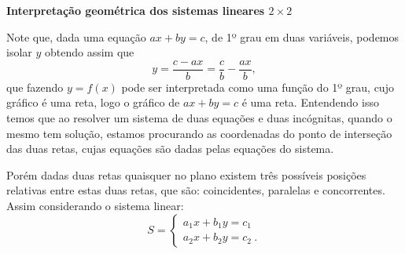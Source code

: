 \textbf{Interpretação geométrica dos sistemas lineares $2 \times 2$}

Note que, dada uma equação $ax + by= c$, de 1º grau em duas variáveis, podemos isolar $y$ obtendo assim que
\[y= \frac{c - ax}{b}= \frac{c}{b} - \frac{ax}{b},\]
que fazendo $y= f(x)$ pode ser interpretada como uma função do 1º grau, cujo gráfico é uma reta, logo o gráfico de $ax + by= c$ é uma reta. Entendendo isso temos que ao resolver um sistema de duas equações e duas incógnitas, quando o mesmo tem solução, estamos procurando as coordenadas do ponto de interseção das duas retas, cujas equações são dadas pelas equações do sistema.

Porém dadas duas retas quaisquer no plano existem três possíveis posições relativas entre estas duas retas, que são: coincidentes, paralelas e concorrentes. Assim considerando o sistema linear:
\[S= \begin{cases}
      a_1x + b_1y= c_1 \\
      a_2x + b_2y= c_2 \ .
     \end{cases}\]

